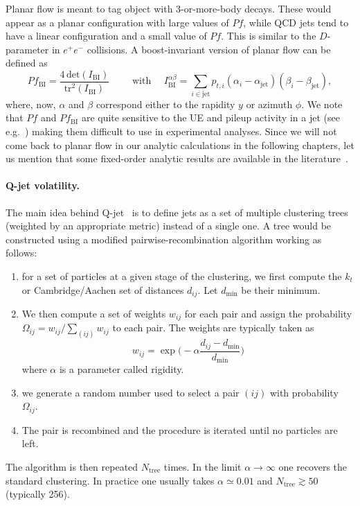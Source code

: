 Planar flow is meant to tag object with 3-or-more-body decays. These
would appear as a planar configuration with large values of $Pf$,
while QCD jets tend to have a linear configuration and a small value
of $Pf$. This is similar to the $D$-parameter in $e^+e^-$ collisions.
%
A boost-invariant version of planar flow can be defined as
\begin{equation}
  Pf_{\text{BI}} = \frac{4\,\text{det}(I_{\text{BI}})}{\text{tr}^2(I_{\text{BI}})}
  \qquad\text{ with }\quad
  I_{\text{BI}} ^{\alpha\beta} = \sum_{i\in \text{jet}}
  p_{t,i} (\alpha_i-\alpha_{\text{jet}}) (\beta_i-\beta_{\text{jet}}),
\end{equation}
where, now, $\alpha$ and $\beta$ correspond either to the rapidity $y$
or azimuth $\phi$.
We note that $Pf$ and $Pf_{\text{BI}}$ are quite sensitive to
the UE and pileup activity in a jet (see
e.g.~\cite{Soyez:2012hv}) making them difficult to use in experimental
analyses. Since we will not come back to planar flow in our analytic
calculations in the following chapters, let us mention that some
fixed-order analytic results are available in the literature~\cite{Field:2012rw}.


\paragraph{Q-jet volatility.}
%
The main idea behind Q-jet~\cite{Ellis:2012sn,Ellis:2014eya} is to define jets as a set of multiple
clustering trees (weighted by an appropriate metric) instead of a
single one. A tree would be constructed using a modified
pairwise-recombination algorithm working as follows:
\begin{enumerate}
\item for a set of particles at a given stage of the clustering, we
  first compute the $k_t$ or Cambridge/Aachen set of distances
  $d_{ij}$. Let $d_{\text{min}}$ be their minimum.
\item We then compute a set of weights $w_{ij}$ for each pair and
  assign the probability $\Omega_{ij}=w_{ij}/\sum_{(ij)}w_{ij}$ to
  each pair. The weights are typically taken as
  \begin{equation}\label{eq:Qjet-rigidity}
    w_{ij} = \exp\bigg(-\alpha\frac{d_{ij}-d_{\text{min}}}{d_{\text{min}}}\bigg)
  \end{equation}
  where $\alpha$ is a parameter called rigidity.
\item we generate a random number used to select a pair $(ij)$ with
  probability $\Omega_{ij}$.
\item The pair is recombined and the procedure is iterated until no
  particles are left.
\end{enumerate}
The algorithm is then repeated $N_{\text{tree}}$ times. In the limit
$\alpha\to\infty$ one recovers the standard clustering. In practice
one usually takes $\alpha \simeq 0.01$ and $N_{\text{tree}}\gtrsim 50$
(typically 256).

